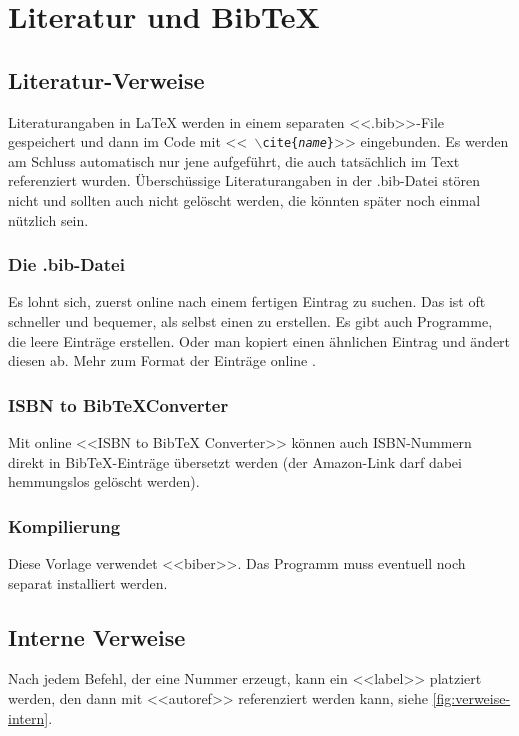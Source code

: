 \chapter{Literatur und Bib\TeX} \label{ch:literatur}
\section{Literatur-Verweise}
Literaturangaben in \LaTeX{} \cite{lamport-latex} werden in einem
separaten <<.bib>>-File gespeichert und dann im Code mit <<{\tt
  $\backslash$cite\{{\em name}\}}>> eingebunden. 
Es werden am Schluss automatisch nur jene aufgeführt, die auch tatsächlich im
Text referenziert wurden. Überschüssige Literaturangaben in der .bib-Datei 
stören nicht und sollten auch nicht gelöscht werden, die könnten später noch
einmal nützlich sein.

\subsection{Die .bib-Datei}
Es lohnt sich, zuerst online nach einem fertigen Eintrag zu
suchen. Das ist oft schneller und bequemer, als selbst einen zu
erstellen. Es gibt auch Programme, die
leere Einträge erstellen. Oder man kopiert einen ähnlichen
Eintrag und ändert diesen ab.
Mehr zum Format der Einträge online \cite{bibtex}.

\subsection{ISBN to Bib\TeX{}Converter}
Mit online <<ISBN to Bib\TeX{} Converter>>
\cite{isbn2bibtex} können auch ISBN-Nummern direkt in
Bib\TeX{}-Einträge übersetzt werden (der Amazon-Link darf dabei
hemmungslos gelöscht werden).

\subsection{Kompilierung}
Diese Vorlage verwendet <<biber>>\cite{bibtex-with-biber}. Das Programm muss
eventuell noch separat installiert werden.

\newpage
\section{Interne Verweise} \label{sec:verweise-intern}
Nach jedem Befehl, der eine Nummer erzeugt, 
kann ein <<label>> platziert werden, den 
dann mit <<autoref>> referenziert werden kann, 
siehe \autoref{fig:verweise-intern}.


